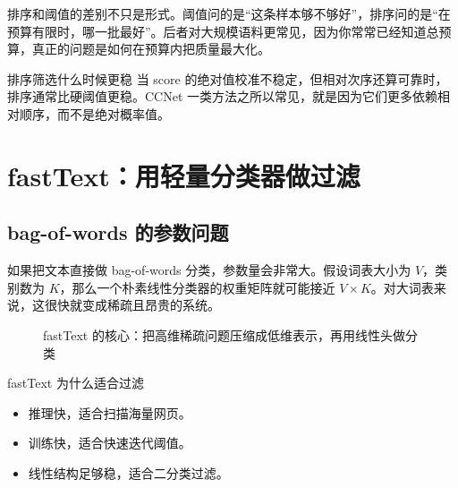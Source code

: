 \documentclass[a4paper]{article}
\begin{document}
排序和阈值的差别不只是形式。阈值问的是“这条样本够不够好”，排序问的是“在预算有限时，哪一批最好”。后者对大规模语料更常见，因为你常常已经知道总预算，真正的问题是如何在预算内把质量最大化。

\begin{knowledgebox}{排序筛选什么时候更稳}
当 score 的绝对值校准不稳定，但相对次序还算可靠时，排序通常比硬阈值更稳。CCNet 一类方法之所以常见，就是因为它们更多依赖相对顺序，而不是绝对概率值。
\end{knowledgebox}

\section{fastText：用轻量分类器做过滤}

\subsection{bag-of-words 的参数问题}

如果把文本直接做 bag-of-words 分类，参数量会非常大。假设词表大小为 $V$，类别数为 $K$，那么一个朴素线性分类器的权重矩阵就可能接近 $V \times K$。对大词表来说，这很快就变成稀疏且昂贵的系统。

\begin{figure}[H]
\centering
{}
\caption{fastText 的核心：把高维稀疏问题压缩成低维表示，再用线性头做分类}
\end{figure}

\begin{knowledgebox}{fastText 为什么适合过滤}
\begin{itemize}
    \item 推理快，适合扫描海量网页。
    \item 训练快，适合快速迭代阈值。
    \item 线性结构足够稳，适合二分类过滤。
\end{itemize}
\end{knowledgebox}
\end{document}
